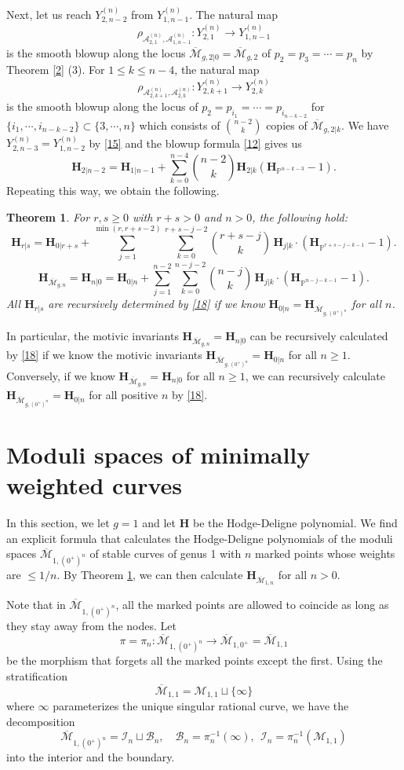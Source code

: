 \documentclass[11pt]{amsart}
\numberwithin{equation}{section}
\newtheorem{theo}{Theorem}[section]
\theoremstyle{definition}
\newcommand{\PP}{\mathbb{P}}
\newcommand{\bH}{\mathbf{H}}
\def\cA{{\mathcal A}}
\def\cB{{\mathcal B}}
\def\cM{{\mathcal M}}
\def\cI{{\mathcal I}}
\def\lra{\longrightarrow }
\def\beq{\begin{equation}}
\def\eeq{\end{equation}}
\def\bcM{\overline{\cM}}
\def\cAn{\cA^{(n)}}
\def\Yn{Y^{(n)}}
\begin{document}
Next, let us reach $\Yn_{2,n-2}$ from $\Yn_{1,n-1}$. 
The natural map
$$\rho_{\cAn_{2,1},\cAn_{1,n-1}}:\Yn_{2,1}\lra \Yn_{1,n-1}$$
is the smooth blowup along the locus $\bcM_{g,2|0}=\bcM_{g,2}$ of $p_2=p_3=\cdots =p_n$ by Theorem \ref{2} (3). 
For $1\le k\le n-4$, the natural map 
$$\rho_{\cAn_{2,k+1},\cAn_{2,k}}:\Yn_{2,k+1}\lra \Yn_{2,k}$$
is the smooth blowup along the locus of $p_2=p_{i_1}=\cdots=p_{i_{n-k-2}}$ for $\{i_1,\cdots,i_{n-k-2}\}\subset \{3,\cdots,n\}$ which consists of $\binom{n-2}{k}$ copies of $\bcM_{g,2|k}$.
We have $\Yn_{2,n-3}=\Yn_{1,n-2}$ by \eqref{15} and the blowup formula \eqref{12} gives us 
\beq\label{16}
\bH_{2|n-2}=\bH_{1|n-1}+\sum_{k=0}^{n-4} \binom{n-2}{k} \bH_{2|k} (\bH_{\PP^{n-k-3}}-1).
\eeq
Repeating this way, we obtain the following. 
\begin{theo}\label{17} For $r,s\ge 0$ with $r+s>0$ and $n>0$, the following hold:
   \beq\label{18} \bH_{r|s} = \bH_{0|r+s} + \sum_{j=1}^{\min(r,r+s-2)} \sum_{k=0}^{r+s-j-2} \binom{r+s-j}{k}\, \bH_{j|k}  \cdot (\bH_{\PP^{r+s-j-k-1}}-1).\eeq
   \beq\label{19} \bH_{\bcM_{g,n}}= \bH_{n|0} = \bH_{0|n} + \sum_{j=1}^{n-2} \sum_{k=0}^{n-j-2} \binom{n-j}{k}\, \bH_{j|k} \cdot (\bH_{\PP^{n-j-k-1}}-1).\eeq
All $\bH_{r|s}$ are recursively determined by \eqref{18} if we know $\bH_{0|n}=\bH_{\bcM_{g,(0^+)^n}}$ for all $n$.   
\end{theo}
In particular, the motivic invariants $\bH_{\bcM_{g,n}}=\bH_{n|0}$ can be recursively calculated by \eqref{18} if we know the motivic invariants $\bH_{\bcM_{g,(0^+)^n}}=\bH_{0|n}$ for all $n\ge 1$. 
Conversely, if we know $\bH_{\bcM_{g,n}}=\bH_{n|0}$ for all $n\ge 1$, we can recursively calculate $\bH_{\bcM_{g,(0^+)^n}}=\bH_{0|n}$ for all positive $n$ by \eqref{18}.





\bigskip

\section{Moduli spaces of minimally weighted curves}
In this section, we let $g=1$ and let $\bH$ be the Hodge-Deligne polynomial. 
We find an explicit formula that calculates the Hodge-Deligne polynomials of the moduli spaces $\bcM_{1,(0^+)^n}$
of stable curves of genus 1 with $n$ marked points whose weights are $\le  1/n$. By Theorem \ref{17}, we can then calculate $\bH_{\bcM_{1,n}}$
for all $n>0$.

Note that in $\bcM_{1,(0^+)^n}$, all the marked points are allowed to coincide as long as they stay away from the nodes. 
Let 
$$\pi=\pi_n:\bcM_{1,(0^+)^n}\lra \bcM_{1,0^+}=\bcM_{1,1}$$
be the morphism that forgets all the marked points except the first. Using the stratification 
$$\bcM_{1,1}=\cM_{1,1}\sqcup \{\infty\}$$
where $\infty$ parameterizes the unique singular rational curve, we have the decomposition
$$\bcM_{1,(0^+)^n}=\cI_n\sqcup \cB_n, \quad \cB_n=\pi_n^{-1}(\infty), \ \ \cI_n=\pi_n^{-1}(\cM_{1,1})$$
into the interior and the boundary. 
\end{document}
